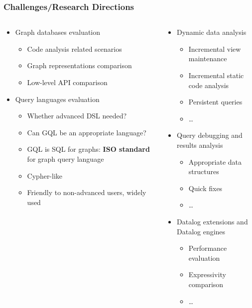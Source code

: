 \documentclass[xcolor=table,aspectratio=169]{beamer}
\begin{document}
\begin{frame}[fragile]
  \frametitle{Challenges/Research Directions}  
  \begin{columns}[t]
    \begin{column}{0.5\textwidth}
  \begin{itemize}
    \item Graph databases evaluation
    \begin{itemize}
      \item Code analysis related scenarios
      \item Graph representations comparison
      \item Low-level API comparison  
    \end{itemize}
    \pause
    \item Query languages evaluation
    \begin{itemize}
      \pause
      \item Whether advanced DSL needed?
      \pause
      \item Can GQL be an appropriate language?
      \item GQL is SQL for graphs: \textbf{ISO standard} for graph query language
      \item Cypher-like 
      \item Friendly to non-advanced users, widely used
    \end{itemize}
  \end{itemize}  
 \end{column}
 \pause
\begin{column}{0.5\textwidth}
  \begin{itemize}
    \item Dynamic data analysis
    \begin{itemize}
      \item Incremental view maintenance
      \item Incremental static code analysis
      \item Persistent queries
      \item \ldots
    \end{itemize}
    \pause
    \item Query debugging and results analysis 
    \begin{itemize}
      \item Appropriate data structures
      \item Quick fixes
      \item \ldots
    \end{itemize}
    \item Datalog extensions and Datalog engines
    \begin{itemize}
      \item Performance evaluation
      \item Expressivity comparison
      \item \ldots
    \end{itemize}
  \end{itemize}
\end{column}
\end{columns}
\end{frame}
\end{document}
